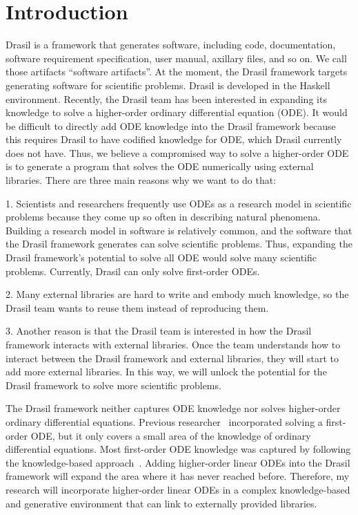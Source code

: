 \chapter{Introduction}
Drasil is a framework that generates software, including code, documentation, software requirement specification, user manual, axillary files, and so on. We call those artifacts ``software artifacts''. At the moment, the Drasil framework targets generating software for scientific problems. Drasil is developed in the Haskell environment. Recently, the Drasil team has been interested in expanding its knowledge to solve a higher-order ordinary differential equation (ODE). It would be difficult to directly add ODE knowledge into the Drasil framework because this requires Drasil to have codified knowledge for ODE, which Drasil currently does not have. Thus, we believe a compromised way to solve a higher-order ODE is to generate a program that solves the ODE numerically using external libraries. There are three main reasons why we want to do that:

1. Scientists and researchers frequently use ODEs as a research model in scientific problems because they come up so often in describing natural phenomena. Building a research model in software is relatively common, and the software that the Drasil framework generates can solve scientific problems. Thus, expanding the Drasil framework's potential to solve all ODE would solve many scientific problems. Currently, Drasil can only solve first-order ODEs.

2. Many external libraries are hard to write and embody much knowledge, so the Drasil team wants to reuse them instead of reproducing them.

3. Another reason is that the Drasil team is interested in how the Drasil framework interacts with external libraries. Once the team understands how to interact between the Drasil framework and external libraries, they will start to add more external libraries. In this way, we will unlock the potential for the Drasil framework to solve more scientific problems. 

The Drasil framework neither captures ODE knowledge nor solves higher-order ordinary differential equations. Previous researcher~\citep{brooks} incorporated solving a first-order ODE, but it only covers a small area of the knowledge of ordinary differential equations. Most first-order ODE knowledge was captured by following the knowledge-based approach~\citep{szymczaketal2016}. Adding higher-order linear ODEs into the Drasil framework will expand the area where it has never reached before. Therefore, my research will incorporate higher-order linear ODEs in a complex knowledge-based and generative environment that can link to externally provided libraries.

